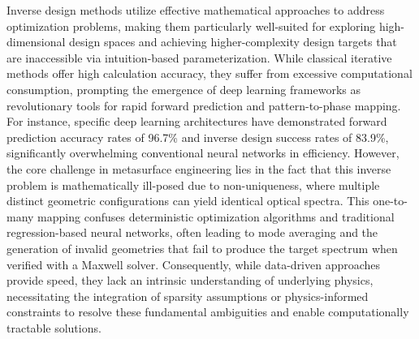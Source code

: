 \documentclass[11pt]{article}
\begin{document}
Inverse design methods utilize effective mathematical approaches to address optimization problems, making them particularly well-suited for exploring high-dimensional design spaces and achieving higher-complexity design targets that are inaccessible via intuition-based parameterization. While classical iterative methods offer high calculation accuracy, they suffer from excessive computational consumption, prompting the emergence of deep learning frameworks as revolutionary tools for rapid forward prediction and pattern-to-phase mapping. For instance, specific deep learning architectures have demonstrated forward prediction accuracy rates of 96.7\% and inverse design success rates of 83.9\%, significantly overwhelming conventional neural networks in efficiency. However, the core challenge in metasurface engineering lies in the fact that this inverse problem is mathematically ill-posed due to non-uniqueness, where multiple distinct geometric configurations can yield identical optical spectra. \citep{doi_10_30560_ijas_v9n1p1_31843ad0} \citep{doi_10_1364_oe_419138_33b8279d} This one-to-many mapping confuses deterministic optimization algorithms and traditional regression-based neural networks, often leading to mode averaging and the generation of invalid geometries that fail to produce the target spectrum when verified with a Maxwell solver. Consequently, while data-driven approaches provide speed, they lack an intrinsic understanding of underlying physics, necessitating the integration of sparsity assumptions or physics-informed constraints to resolve these fundamental ambiguities and enable computationally tractable solutions. \citep{doi_10_1088_1361_6439_ad3a72_72d60f33} \citep{doi_10_1016_j_rio_2026_100988_b00ee173} \citep{doi_10_1515_nanoph_2019_0474_d2187501} \citep{doi_10_71465_fapm546_bda368a5}
\end{document}
